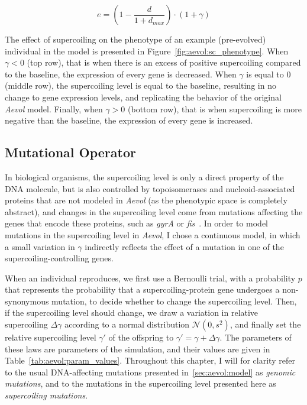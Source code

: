 \begin{equation}
e = (1 - \frac{d}{1+d_{max}}) \cdot (1 + \gamma)
\label{eq:aevol:sc}
\end{equation}

The effect of supercoiling on the phenotype of an example (pre-evolved) individual in the model is presented in Figure~\ref{fig:aevol:sc_phenotype}.
When $\gamma < 0$ (top row), that is when there is an excess of positive supercoiling compared to the baseline, the expression of every gene is decreased.
When $\gamma$ is equal to 0 (middle row), the supercoiling level is equal to the baseline, resulting in no change to gene expression levels, and replicating the behavior of the original \emph{Aevol} model.
Finally, when $\gamma > 0$ (bottom row), that is when supercoiling is more negative than the baseline, the expression of every gene is increased.

\subsection{Mutational Operator}
In biological organisms, the supercoiling level is only a direct property of the DNA molecule, but is also controlled by topoisomerases and nucleoid-associated proteins that are not modeled in \emph{Aevol} (as the phenotypic space is completely abstract), and changes in the supercoiling level come from mutations affecting the genes that encode these proteins, such as \emph{gyrA} or \emph{fis}~\citep{crozat2005}.
In order to model mutations in the supercoiling level in \emph{Aevol}, I chose a continuous model, in which a small variation in $\gamma$ indirectly reflects the effect of a mutation in one of the supercoiling-controlling genes.

When an individual reproduces, we first use a Bernoulli trial, with a probability $p$ that represents the probability that a supercoiling-protein gene undergoes a non-synonymous mutation, to decide whether to change the supercoiling level.
Then, if the supercoiling level should change, we draw a variation in relative supercoiling $\Delta\gamma$ according to a normal distribution $\mathcal{N}(0, s^2)$, and finally set the relative supercoiling level $\gamma'$ of the offspring to $\gamma' = \gamma + \Delta\gamma$.
The parameters of these laws are parameters of the simulation, and their values are given in Table~\ref{tab:aevol:param_values}.
Throughout this chapter, I will for clarity refer to the usual DNA-affecting mutations presented in~\ref{sec:aevol:model} as \emph{genomic mutations}, and to the mutations in the supercoiling level presented here as \emph{supercoiling mutations}.


